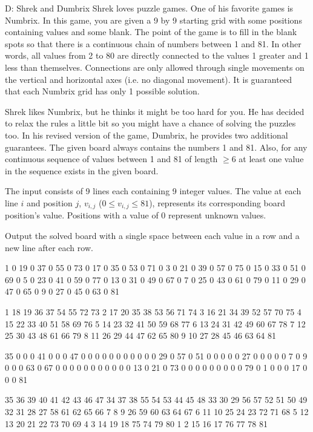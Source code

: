 \begin{problem}{D: Shrek and Dumbrix}
Shrek loves puzzle games.
One of his favorite games is Numbrix.
In this game, you are given a 9 by 9 starting grid with some positions containing values and some blank.
The point of the game is to fill in the blank spots so that there is a continuous chain of numbers between 1 and 81.
In other words, all values from 2 to 80 are directly connected to the values 1 greater and 1 less than themselves.
Connections are only allowed through single movements on the vertical and horizontal axes (i.e. no diagonal movement).
It is guaranteed that each Numbrix grid has only 1 possible solution.

Shrek likes Numbrix, but he thinks it might be too hard for you.
He has decided to relax the rules a little bit so you might have a chance of solving the puzzles too.
In his revised version of the game, Dumbrix, he provides two additional guarantees.
The given board always contains the numbers 1 and 81.
Also, for any continuous sequence of values between 1 and 81 of length $\geq 6$ at least one value in the sequence exists in the given board.
\end{problem}

\begin{formalin}
The input consists of 9 lines each containing 9 integer values.
The value at each line $i$ and position $j$, $v_{i,j}$ ($0 \leq v_{i,j} \leq 81$), represents its corresponding board position's value.
Positions with a value of 0 represent unknown values.
\end{formalin}

\begin{formalout}
Output the solved board with a single space between each value in a row and a new line after each row.
\end{formalout}

\begin{datain}
1 0 19 0 37 0 55 0 73
0 17 0 35 0 53 0 71 0
3 0 21 0 39 0 57 0 75
0 15 0 33 0 51 0 69 0
5 0 23 0 41 0 59 0 77
0 13 0 31 0 49 0 67 0
7 0 25 0 43 0 61 0 79
0 11 0 29 0 47 0 65 0
9 0 27 0 45 0 63 0 81
\end{datain}
\begin{dataout}
1 18 19 36 37 54 55 72 73
2 17 20 35 38 53 56 71 74
3 16 21 34 39 52 57 70 75
4 15 22 33 40 51 58 69 76
5 14 23 32 41 50 59 68 77
6 13 24 31 42 49 60 67 78
7 12 25 30 43 48 61 66 79
8 11 26 29 44 47 62 65 80
9 10 27 28 45 46 63 64 81
\end{dataout}

\begin{datain}
35 0 0 0 41 0 0 0 47
0 0 0 0 0 0 0 0 0
0 0 29 0 57 0 51 0 0
0 0 0 27 0 0 0 0 0
7 0 9 0 0 0 63 0 67
0 0 0 0 0 0 0 0 0
0 0 13 0 21 0 73 0 0
0 0 0 0 0 0 0 79 0
1 0 0 0 17 0 0 0 81
\end{datain}
\begin{dataout}
35 36 39 40 41 42 43 46 47
34 37 38 55 54 53 44 45 48
33 30 29 56 57 52 51 50 49
32 31 28 27 58 61 62 65 66
7 8 9 26 59 60 63 64 67
6 11 10 25 24 23 72 71 68
5 12 13 20 21 22 73 70 69
4 3 14 19 18 75 74 79 80
1 2 15 16 17 76 77 78 81
\end{dataout}
